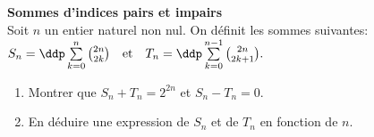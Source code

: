
\begin{exercice}   \; \textbf{Sommes d'indices pairs et impairs}\\
\noindent Soit $n$ un entier naturel non nul. On d\'efinit les sommes suivantes: $S_n=\ddp \sum\limits_{k=0}^{n} \binom{2n}{2k}\quad \hbox{et}\quad T_n=\ddp \sum\limits_{k=0}^{n-1} \binom{2n}{2k+1}.$
\begin{enumerate}
\item Montrer que $S_n+T_n=2^{2n}$ et $S_n-T_n=0$.
\item En d\'eduire une expression de $S_n$ et de $T_n$ en fonction de $n$.
\end{enumerate} 
\end{exercice}